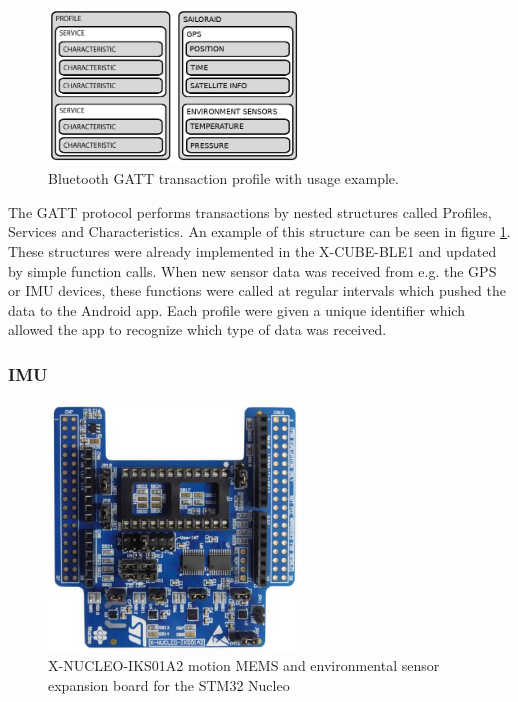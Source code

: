 \begin{figure}[H]
\centering
\includegraphics[width=0.6\textwidth]{Figures/bt_gatt_profile.png}
\caption{Bluetooth GATT transaction profile with usage example.}
\label{bt-gatt-profile}
\end{figure}

The GATT protocol performs transactions by nested structures called Profiles, Services and Characteristics. An example of this structure can be seen in figure \ref{bt-gatt-profile}. These structures were already implemented in the X-CUBE-BLE1 and updated by simple function calls. When new sensor data was received from e.g. the GPS or IMU devices, these functions were called at regular intervals which pushed the data to the Android app. Each profile were given a unique identifier which allowed the app to recognize which type of data was received.

\subsubsection{IMU}

\begin{figure}[H]
\centering
\includegraphics[width=0.6\textwidth]{Figures/x-nucleo-iks01a2.jpg}
\caption{X-NUCLEO-IKS01A2 motion MEMS and environmental sensor expansion board for the STM32 Nucleo}
\label{imu-eval-board}
\end{figure}

